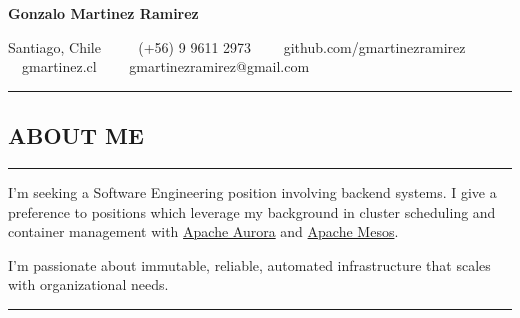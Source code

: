 \documentclass[10pt,letterpaper]{article}
\begin{document}
\begin{center}{\huge \textbf{Gonzalo Martinez Ramirez}}

Santiago, Chile \ \ \textbullet
\ \ (+56) 9 9611 2973\ \ \textbullet
\ \ github.com/gmartinezramirez\ \ \textbullet
\ \ gmartinez.cl\ \ \textbullet
\ \ gmartinezramirez@gmail.com

\end{center}

\hrule
\vspace{-1.0em}
\subsection*{ABOUT ME}
\vspace{-0.3em}
\hrule
\vspace{0.5em}

\noindent I'm seeking a Software Engineering position involving backend systems.
I give a preference to positions which leverage my background in cluster
scheduling and container management with \href{aurora.apache.org}{Apache Aurora}
and \href{mesos.apache.org}{Apache Mesos}.

\noindent I'm passionate about immutable, reliable, automated infrastructure
that scales with organizational needs.
\\

\hrule
\vspace{-1.0em}
\end{document}
